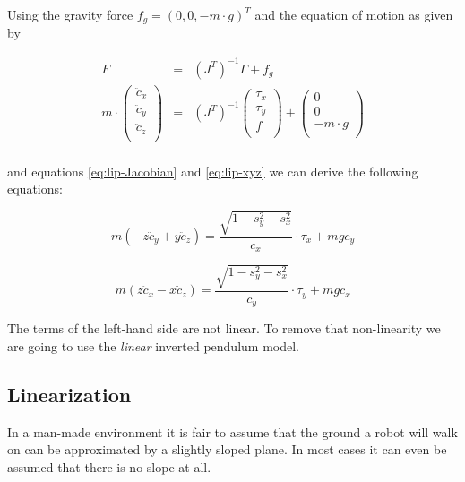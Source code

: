 \documentclass[english,ngerman]{KITreprt}
\begin{document}
Using the gravity force $f_g = (0, 0, -m \cdot g)^T$ and the equation of
motion as given by

\begin{equation}
\begin{array}{lcr}
F & = & (J^T)^{-1} \Gamma + f_g \\
m \cdot
\left(\begin{array}{c}
{\ddot c}_x \\
{\ddot c}_y \\
{\ddot c}_z \\
\end{array}\right)
& = & (J^T)^{-1}
\left(\begin{array}{c}
\tau_x \\
\tau_y \\
f \\
\end{array}\right)
+
\left(\begin{array}{c}
0 \\
0 \\
-m \cdot g \\
\end{array}\right) \\
\end{array}
\end{equation}

and equations \ref{eq:lip-Jacobian} and \ref{eq:lip-xyz} we can derive
the following equations:

\begin{equation} \label{eq:lip-dyn-y}
m(-z\ddot{c}_y + y\ddot{c}_z) = \frac{\sqrt{1 - s_y^2 - s_x^2}}{c_x} \cdot \tau_x + m g c_y
\end{equation}

\begin{equation} \label{eq:lip-dyn-x}
m(z\ddot{c}_x - x\ddot{c}_z) = \frac{\sqrt{1 - s_y^2 - s_x^2}}{c_y} \cdot \tau_y + m g c_x
\end{equation}

The terms of the left-hand side are not linear. To remove that
non-linearity we are going to use the \emph{linear} inverted pendulum
model.

\subsection{Linearization}\label{linearization}

In a man-made environment it is fair to assume that the ground a robot
will walk on can be approximated by a slightly sloped plane. In most
cases it can even be assumed that there is no slope at all.
\end{document}
